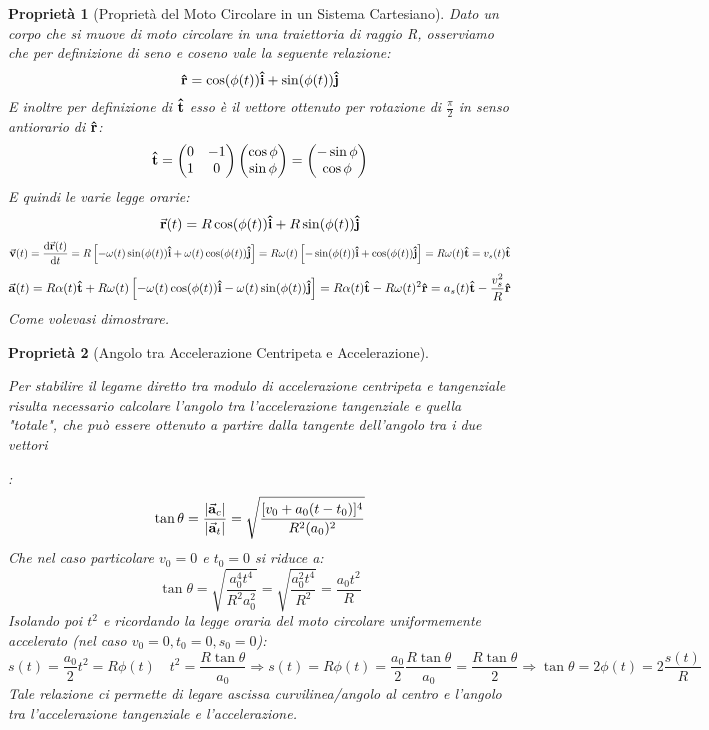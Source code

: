 \documentclass{article}
\newtheorem{property}{Proprietà}[section]
\newcommand{\then}{\ensuremath{\Rightarrow}}
\renewcommand{\i}{\vu{i}}
\renewcommand{\j}{\vu{j}}
\renewcommand{\a}{\va{a}}
\renewcommand{\v}{\va{v}}
\newcommand{\verst}{\vu{t}}
\newcommand{\versr}{\vu{r}}
\renewcommand{\r}{\va{r}}
\begin{document}
\begin{property}[Proprietà del Moto Circolare in un Sistema Cartesiano]
Dato un corpo che si muove di moto circolare in una traiettoria di raggio R, osserviamo che per definizione di seno e coseno vale la seguente relazione:
\[\versr=\cos(\phi(t))\i+\sin(\phi(t))\j\]
E inoltre per definizione di $\verst$ esso è il vettore ottenuto per rotazione di $\frac{\pi}{2}$ in senso antiorario di $\versr$:
\[\verst=\begin{pmatrix}0&-1\\1&0\\\end{pmatrix}\begin{pmatrix}\cos\phi\\\sin\phi\end{pmatrix}=\begin{pmatrix}-\sin\phi\\\cos\phi\\\end{pmatrix}\]
E quindi le varie legge orarie:
\[\r(t)=R\cos(\phi(t))\i+R\sin(\phi(t))\j\]
\[\v(t)=\dv{\r(t)}{t}=R\left[-\omega(t)\sin(\phi(t))\i+\omega(t)\cos(\phi(t))\j\right]=R\omega(t)\left[-\sin(\phi(t))\i+\cos(\phi(t))\j\right]=R\omega(t)\verst=v_s(t)\verst\]
\[\a(t)=R\alpha(t)\verst+R\omega(t)\left[-\omega(t)\cos(\phi(t))\i-\omega(t)\sin(\phi(t))\j\right]=R\alpha(t)\verst-R\omega(t)^2\versr=a_s(t)\verst-\frac{v_s^2}{R}\versr\]
Come volevasi dimostrare.
\end{property}

\begin{property}[Angolo tra Accelerazione Centripeta e Accelerazione]
\hypertarget{angoloaccmotocirc}{Per stabilire il legame diretto tra modulo di accelerazione centripeta e tangenziale risulta necessario calcolare l'angolo tra l'accelerazione tangenziale e quella "totale", che può essere ottenuto a partire dalla tangente dell'angolo tra i due vettori}:
\[\tan\theta=\frac{|\a_c|}{|\a_t|}=\sqrt{\frac{[v_0+a_0(t-t_0)]^4}{R^2(a_0)^2}}\]
Che nel caso particolare $v_0=0$ e $t_0=0$ si riduce a:
\[\tan\theta=\sqrt{\frac{a_0^4t^4}{R^2a_0^2}}=\sqrt{\frac{a_0^2t^4}{R^2}}=\frac{a_0t^2}{R}\]
Isolando poi $t^2$ e ricordando la legge oraria del moto circolare uniformemente accelerato (nel caso $v_0=0,t_0=0,s_0=0$):
\[s(t)=\frac{a_0}{2}t^2=R\phi(t)\quad t^2=\frac{R\tan\theta}{a_0}\then s(t)=R\phi(t)=\frac{a_0}{2}\frac{R\tan\theta}{a_0}=\frac{R\tan\theta}{2}\then \tan\theta=2\phi(t)=2\frac{s(t)}{R}\]
Tale relazione ci permette di legare ascissa curvilinea/angolo al centro e l'angolo tra l'accelerazione tangenziale e l'accelerazione.
\end{property}
\end{document}
